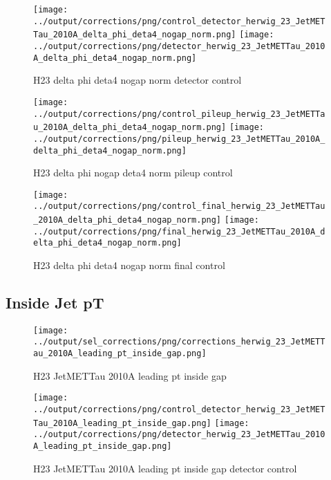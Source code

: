 \documentclass[11pt]{book}
\begin{document}
\begin{figure}[ht]
\centering
\texttt{[image: ../output/corrections/png/control\_detector\_herwig\_23\_JetMETTau\_2010A\_delta\_phi\_deta4\_nogap\_norm.png]}
\texttt{[image: ../output/corrections/png/detector\_herwig\_23\_JetMETTau\_2010A\_delta\_phi\_deta4\_nogap\_norm.png]}
\caption{H23 delta phi deta4 nogap norm detector control}
\label{fig:H23_JetMETTau_2010A_delta_phi_deta4_nogap_norm_detector_control}
\end{figure}

\begin{figure}[ht]
\centering
\texttt{[image: ../output/corrections/png/control\_pileup\_herwig\_23\_JetMETTau\_2010A\_delta\_phi\_deta4\_nogap\_norm.png]}
\texttt{[image: ../output/corrections/png/pileup\_herwig\_23\_JetMETTau\_2010A\_delta\_phi\_deta4\_nogap\_norm.png]}
\caption{H23 delta phi nogap deta4 norm pileup control}
\label{fig:H23_JetMETTau_2010A_delta_phi_deta4_nogap_norm_pileup_control}
\end{figure}


\begin{figure}[ht]
\centering
\texttt{[image: ../output/corrections/png/control\_final\_herwig\_23\_JetMETTau\_2010A\_delta\_phi\_deta4\_nogap\_norm.png]}
\texttt{[image: ../output/corrections/png/final\_herwig\_23\_JetMETTau\_2010A\_delta\_phi\_deta4\_nogap\_norm.png]}
\caption{H23 delta phi deta4 nogap norm final control}
\label{fig:H23_JetMETTau_2010A_delta_phi_deta4_nogap_norm_final_control}
\end{figure}

\clearpage
\subsection{Inside Jet pT}
\begin{figure}[ht]
\centering
\texttt{[image: ../output/sel\_corrections/png/corrections\_herwig\_23\_JetMETTau\_2010A\_leading\_pt\_inside\_gap.png]}
\caption{H23 JetMETTau 2010A leading pt inside gap}
\label{fig:H23_JetMETTau_2010A_leading_pt_inside_gap}
\end{figure}

\begin{figure}[ht]
\centering
\texttt{[image: ../output/corrections/png/control\_detector\_herwig\_23\_JetMETTau\_2010A\_leading\_pt\_inside\_gap.png]}
\texttt{[image: ../output/corrections/png/detector\_herwig\_23\_JetMETTau\_2010A\_leading\_pt\_inside\_gap.png]}
\caption{H23 JetMETTau 2010A leading pt inside gap detector control}
\label{fig:H23_JetMETTau_2010A_leading_pt_inside_gap_detector_control}
\end{figure}
\end{document}
